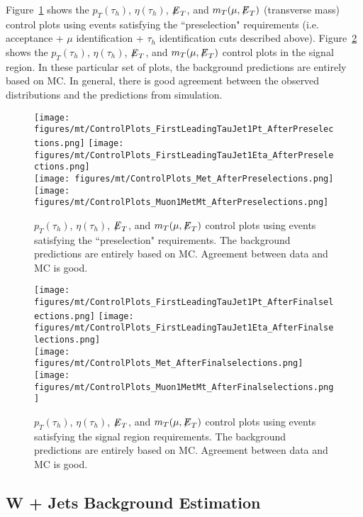 Figure~\ref{fig:muTauPreselectionControlPlots} shows the $p_{T}(\tau_{h})$, $\eta(\tau_{h})$, ${\not\mathrel{E}}_T$, and $m_{T}(\mu,{\not\mathrel{E}}_T)$ (transverse mass) control plots using events satisfying 
the ``preselection" requirements (i.e. acceptance + $\mu$ identification + $\tau_{h}$ identification cuts described above). 
Figure~\ref{fig:muTauFinalselectionControlPlots} shows the $p_{T}(\tau_{h})$, $\eta(\tau_{h})$, ${\not\mathrel{E}}_T$, and $m_{T}(\mu,{\not\mathrel{E}}_T)$ control plots in the signal region. 
In these particular set of plots, the background predictions are entirely based on MC. In general, there is good agreement between the observed distributions and the 
predictions from simulation.

\begin{figure}\centering
  \texttt{[image: figures/mt/ControlPlots\_FirstLeadingTauJet1Pt\_AfterPreselections.png]}
  \texttt{[image: figures/mt/ControlPlots\_FirstLeadingTauJet1Eta\_AfterPreselections.png]} \\
  \texttt{[image: figures/mt/ControlPlots\_Met\_AfterPreselections.png]}
  \texttt{[image: figures/mt/ControlPlots\_Muon1MetMt\_AfterPreselections.png]}
  \caption{\label{fig:muTauPreselectionControlPlots} $p_{T}(\tau_{h})$, $\eta(\tau_{h})$, ${\not\mathrel{E}}_T$, and $m_{T}(\mu,{\not\mathrel{E}}_T)$ control plots using events satisfying the 
``preselection" requirements. The background predictions are entirely based on MC. Agreement between data and MC is good.}
\end{figure}

\begin{figure}\centering
  \texttt{[image: figures/mt/ControlPlots\_FirstLeadingTauJet1Pt\_AfterFinalselections.png]}
  \texttt{[image: figures/mt/ControlPlots\_FirstLeadingTauJet1Eta\_AfterFinalselections.png]} \\
  \texttt{[image: figures/mt/ControlPlots\_Met\_AfterFinalselections.png]}
  \texttt{[image: figures/mt/ControlPlots\_Muon1MetMt\_AfterFinalselections.png]}
  \caption{\label{fig:muTauFinalselectionControlPlots} $p_{T}(\tau_{h})$, $\eta(\tau_{h})$, ${\not\mathrel{E}}_T$, and $m_{T}(\mu,{\not\mathrel{E}}_T)$ control plots using events satisfying 
the signal region requirements. The background predictions are entirely based on MC. Agreement between data and MC is good.}
\end{figure}

\subsection{W + Jets Background Estimation}

